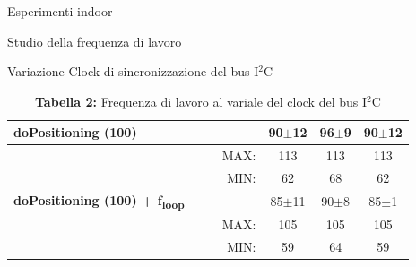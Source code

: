 \documentclass[12pt]{report}
\begin{document}
\begin{section}{Esperimenti indoor}
\begin{subsection}{Studio della frequenza di lavoro}
\begin{subsubsection}{Variazione Clock di sincronizzazione del bus I$^2$C}
\begin{table}[H]
\begin{tabular}{|lcc|r|c|c|c|}
					\hline
					{\textbf{doPositioning (100)}}&	 \multicolumn{3}{l|}{}&											90$\pm$12&				96$\pm$9&				90$\pm$12\\
					\hline
					 &	 & &							 MAX:&																					113&							113&							113\\
					\hline
					 &	 & &							 MIN:&																					62&							68&							62\\
					\hline
					{\textbf{doPositioning (100) + f\textsubscript{loop}}}&	 	\multicolumn{3}{l|}{}&		85$\pm$11&				90$\pm$8&				85$\pm$1\\
					\hline
					 &	 & &							 MAX:&																					105&							105&							105\\
					\hline
					 &	 & &							 MIN:&																					59&							64&							59\\
					\hline
				\end{tabular}
				\caption{\textbf{Tabella 2: } Frequenza di lavoro al variale del clock del bus I$^2$C\label{Tfreqpos}}
			\end{table}	
 

\end{subsubsection}
\end{subsection}
\end{section}
\end{document}
